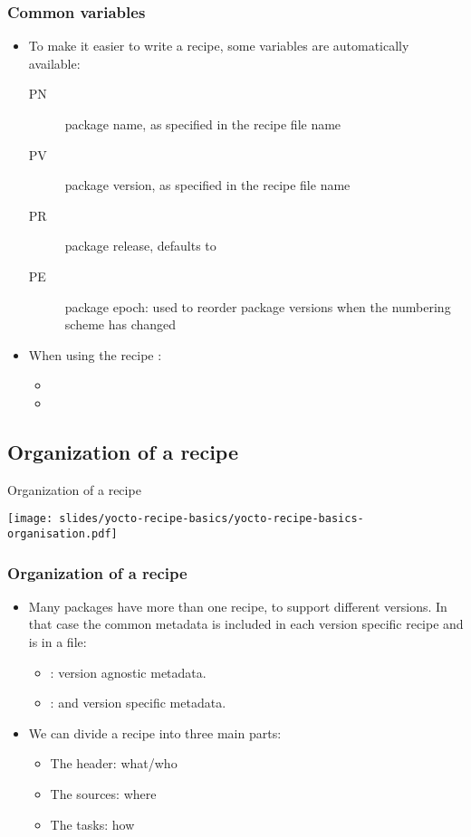 \begin{frame}
  \frametitle{Common variables}
  \begin{itemize}
    \item To make it easier to write a recipe, some variables are
      automatically available:
      \begin{description}
        \item[PN] package name, as specified in the recipe file name
        \item[PV] package version, as specified in the recipe file
          name
        \item[PR] package release, defaults to 
        \item[PE] package epoch: used to reorder package versions when
          the numbering scheme has changed
      \end{description}
    \item When using the recipe :
      \begin{itemize}
        \item {}
        \item {}
      \end{itemize}
  \end{itemize}
\end{frame}

\subsection{Organization of a recipe}

\begin{frame}{Organization of a recipe}
  \begin{center}
    \texttt{[image: slides/yocto-recipe-basics/yocto-recipe-basics-organisation.pdf]}
  \end{center}
\end{frame}

\begin{frame}
  \frametitle{Organization of a recipe}
  \begin{itemize}
    \item Many packages have more than one recipe, to support
      different versions. In that case the common metadata is
      included in each version specific recipe and is in a 
      file:
      \begin{itemize}
        \item {}: version agnostic metadata.
        \item {}:  and version specific metadata.
      \end{itemize}
    \item We can divide a recipe into three main parts:
      \begin{itemize}
        \item The header: what/who
        \item The sources: where
        \item The tasks: how
      \end{itemize}
  \end{itemize}
\end{frame}

